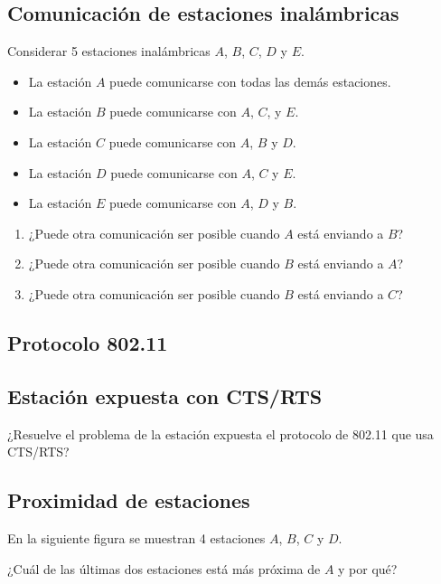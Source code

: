 \documentclass[12pt]{report}
\begin{document}
\begin{exer}
\subsection{Comunicación de estaciones inalámbricas \sthree \steo}
Considerar 5 estaciones inalámbricas $A$, $B$, $C$, $D$ y $E$.

\begin{itemize}
\item La estación $A$ puede comunicarse con todas las demás estaciones.
\item La estación $B$ puede comunicarse con $A$, $C$, y $E$.
\item La estación $C$ puede comunicarse con $A$, $B$ y $D$.
\item La estación $D$ puede comunicarse con $A$, $C$ y $E$.
\item La estación $E$ puede comunicarse con $A$, $D$ y $B$.
\end{itemize}

\begin{enumerate}
\item ¿Puede otra comunicación ser posible cuando $A$ está enviando a $B$?
\item ¿Puede otra comunicación ser posible cuando $B$ está enviando a $A$?
\item ¿Puede otra comunicación ser posible cuando $B$ está enviando a $C$?
\end{enumerate}
\end{exer}

\begin{exer}
\section{Protocolo 802.11}
\subsection{Estación expuesta con CTS/RTS \stwo \steo}
¿Resuelve el problema de la estación expuesta el protocolo de 802.11 que usa CTS/RTS?
\end{exer}

\begin{exer}
\subsection{Proximidad de estaciones \sthree}
En la siguiente figura se muestran 4 estaciones $A$, $B$, $C$ y $D$.


¿Cuál de las últimas dos estaciones está más próxima de $A$ y por qué?
\end{exer}
\end{document}
